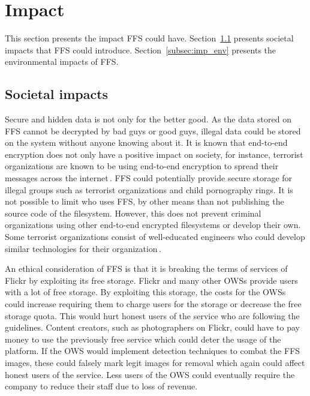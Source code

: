 \section{Impact}
\label{sec:imp}
This section presents the impact \gls{FFS} could have. Section~\ref{subsec:imp_soc} presents societal impacts that \gls{FFS} could introduce. Section~\ref{subsec:imp_env} presents the environmental impacts of \gls{FFS}.

\subsection{Societal impacts}
\label{subsec:imp_soc}
Secure and hidden data is not only for the better good. As the data stored on \gls{FFS} cannot be decrypted by bad guys or good guys, illegal data could be stored on the system without anyone knowing about it. It is known that \mbox{end-to-end} encryption does not only have a positive impact on society, for instance, terrorist organizations are known to be using \mbox{end-to-end} encryption to spread their messages across the internet\,\cite{ruddEncryptionCounterterrorismGetting2017}. \gls{FFS} could potentially provide secure storage for illegal groups such as terrorist organizations and child pornography rings. It is not possible to limit who uses \gls{FFS}, by other means than not publishing the source code of the filesystem. However, this does not prevent criminal organizations using other \mbox{end-to-end} encrypted filesystems or develop their own. Some terrorist organizations consist of \mbox{well-educated} engineers who could develop similar technologies for their organization\,\cite{berrebyEngineeringTerror2010}.

An ethical consideration of \gls{FFS} is that it is breaking the terms of services of Flickr by exploiting its free storage. Flickr and many other \gls{OWS}s provide users with a lot of free storage. By exploiting this storage, the costs for the \gls{OWS}s could increase requiring them to charge users for the storage or decrease the free storage quota. This would hurt honest users of the service who are following the guidelines. Content creators, such as photographers on Flickr, could have to pay money to use the previously free service which could deter the usage of the platform. If the \gls{OWS} would implement detection techniques to combat the \gls{FFS} images, these could falsely mark legit images for removal which again could affect honest users of the service. Less users of the \gls{OWS} could eventually require the company to reduce their staff due to loss of revenue. 

